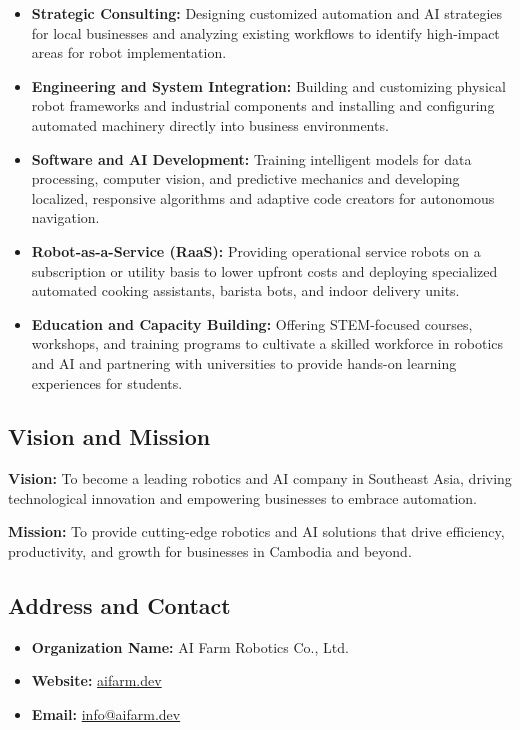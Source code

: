 \begin{itemize}        
    \item \textbf{Strategic Consulting:} Designing customized automation and AI strategies for local businesses and analyzing existing workflows to identify high-impact areas for robot implementation.
    \item \textbf{Engineering and System Integration:} Building and customizing physical robot frameworks and industrial components and installing and configuring automated machinery directly into business environments.
    \item \textbf{Software and AI Development:} Training intelligent models for data processing, computer vision, and predictive mechanics and developing localized, responsive algorithms and adaptive code creators for autonomous navigation.
    \item \textbf{Robot-as-a-Service (RaaS):} Providing operational service robots on a subscription or utility basis to lower upfront costs and deploying specialized automated cooking assistants, barista bots, and indoor delivery units.
    \item \textbf{Education and Capacity Building:} Offering STEM-focused courses, workshops, and training programs to cultivate a skilled workforce in robotics and AI and partnering with universities to provide hands-on learning experiences for students.
\end{itemize}

\subsection{Vision and Mission}
\textbf{Vision:} To become a leading robotics and AI company in Southeast Asia, driving technological innovation and empowering businesses to embrace automation.

\textbf{Mission:} To provide cutting-edge robotics and AI solutions that drive efficiency, productivity, and growth for businesses in Cambodia and beyond.

\subsection{Address and Contact}

\begin{itemize}        
    \item \textbf{Organization Name:} AI Farm Robotics Co., Ltd.
    \item \textbf{Website:} \href{https://aifarm.dev/}{aifarm.dev}
    \item \textbf{Email:} \href{mailto:info@aifarm.dev}{info@aifarm.dev}
\end{itemize}

